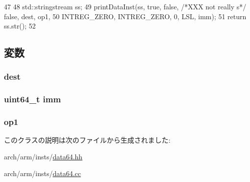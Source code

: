 \begin{DoxyCode}
47 {
48     std::stringstream ss;
49     printDataInst(ss, true, false, /*XXX not really s*/ false, dest, op1,
50                   INTREG_ZERO, INTREG_ZERO, 0, LSL, imm);
51     return ss.str();
52 }
\end{DoxyCode}


\subsection{変数}
\hypertarget{classArmISA_1_1DataXImmOp_aec72e8e45bdc87abeeeb75d2a8a9a716}{
\subsubsection[{dest}]{ {\bf dest}}}
\label{classArmISA_1_1DataXImmOp_aec72e8e45bdc87abeeeb75d2a8a9a716}
\hypertarget{classArmISA_1_1DataXImmOp_a2b4406ad2843b5aa12d244d01d8fdc69}{
\subsubsection[{imm}]{\setlength{\rightskip}{0pt plus 5cm}uint64\_\-t {\bf imm}}}
\label{classArmISA_1_1DataXImmOp_a2b4406ad2843b5aa12d244d01d8fdc69}
\hypertarget{classArmISA_1_1DataXImmOp_a4c465c43ad568f8bcf8ae71480e9cfea}{
\subsubsection[{op1}]{ {\bf op1}}}
\label{classArmISA_1_1DataXImmOp_a4c465c43ad568f8bcf8ae71480e9cfea}


このクラスの説明は次のファイルから生成されました:\begin{DoxyCompactItemize}
\item 
arch/arm/insts/\hyperlink{data64_8hh}{data64.hh}\item 
arch/arm/insts/\hyperlink{data64_8cc}{data64.cc}\end{DoxyCompactItemize}
